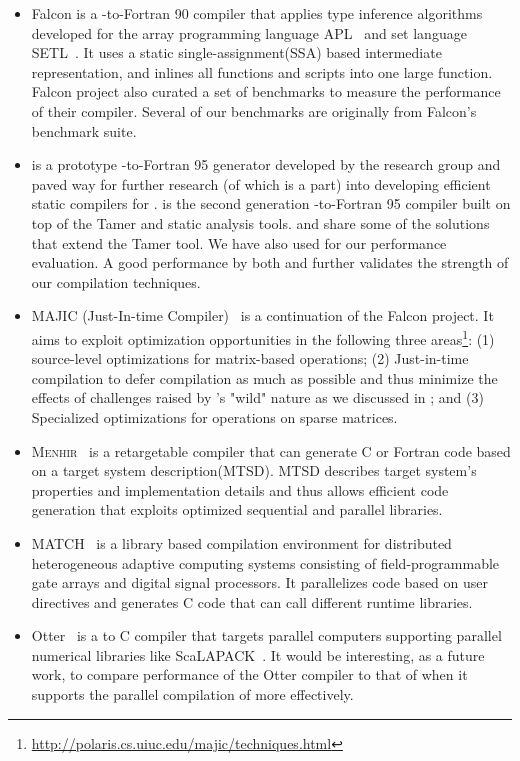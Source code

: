 \begin{itemize}
\item Falcon is a \matlab-to-Fortran 90 compiler that applies type inference
algorithms developed for the array programming language
APL~\cite{magica,805380,801218} and set
language SETL~\cite{361235}. It uses a static single-assignment(SSA) based
intermediate representation, and inlines all functions and scripts into one
large function. Falcon project also curated a set of \matlab benchmarks to
measure the performance of their compiler. Several of our benchmarks are
originally from Falcon's benchmark suite.
\item \mcfor is a prototype \matlab-to-Fortran 95 generator developed by the
\mclab research group and paved way for further research (of which \mixten is a
part) into developing efficient static \matlab compilers for \matlab. \mctwofor
is the second generation \matlab-to-Fortran 95 compiler built on top of the
Tamer and \mcsaf static analysis tools. \mixten and \mctwofor share some of the
solutions that extend the Tamer tool. We have also used \mctwofor for our
performance evaluation. A good performance by both \mixten and \mctwofor further
validates the strength of our compilation techniques.
\item MAJIC (\matlab Just-In-time Compiler)~\cite{MaJIC} is a continuation of the
Falcon project. It aims to exploit optimization opportunities in the following
three areas\footnote{\url{http://polaris.cs.uiuc.edu/majic/techniques.html}}:
(1) source-level optimizations for matrix-based operations; (2) Just-in-time
compilation to defer compilation as much as possible and thus minimize the
effects of challenges raised by \matlab's "wild" nature as we discussed in
; and (3) Specialized optimizations for operations on
sparse matrices.
\item \textsc{Menhir}~\cite{745866} is a retargetable \matlab compiler that can
generate C or Fortran code based on a target system description(MTSD). MTSD
describes target system's properties and implementation details and thus allows
efficient code generation that exploits optimized sequential and parallel
libraries. 
\item MATCH~\cite{MAT2C} is a library based compilation environment for distributed
heterogeneous adaptive computing systems consisting of field-programmable gate
arrays and digital signal processors. It parallelizes \matlab code based on user
directives and generates C code that can call different runtime libraries. 
\item Otter~\cite{Quinn} is a \matlab to C compiler that targets parallel computers
supporting parallel numerical libraries like ScaLAPACK~\cite{898821}. It would be interesting,
as a future work, to compare performance of the Otter compiler to that of
\mixten when it supports the parallel compilation of \matlab more effectively.
\end{itemize}      

